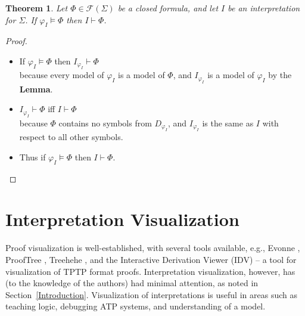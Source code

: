 \documentclass[letterpaper]{article}
\newcommand{\smalltt}[1]{\small \texttt{#1}}
\newtheorem*{theorem}{Theorem}
\begin{document}
\begin{theorem}
Let $\Phi \in \mathcal{F}(\Sigma)$ be a closed formula, and let $I$ be an interpretation for
$\Sigma$. 
If $\varphi_I \models \Phi$ then $I \vdash \Phi$.
\end{theorem}
\vspace*{-1em}
\begin{proof}
~\linebreak
\vspace*{-1.5em}
\begin{itemize}
\item If $\varphi_I \models \Phi$ then $I_{\varphi_I} \vdash \Phi$ \\
      because every model of $\varphi_I$ is a model of $\Phi$, and $I_{\varphi_I}$ is a model
      of $\varphi_I$ by the {\bf Lemma}.
\item $I_{\varphi_I} \vdash \Phi$ iff $I \vdash \Phi$ \\
      because $\Phi$ contains no symbols from $D_{\varphi_I}$, and $I_{\varphi_I}$ is the same
      as $I$ with respect to all other symbols.
\item Thus if $\varphi_I \models \Phi$ then $I \vdash \Phi$.
\end{itemize}
\end{proof}

\section{Interpretation Visualization}
\label{Visualization}

Proof visualization is well-established, with several tools available, e.g., 
Evonne \cite{AB+22},
ProofTree \cite{Tew17},
Treehehe \cite{Bat18},
and
the Interactive Derivation Viewer \cite{TPS07} (IDV) -- a tool for visualization of 
TPTP format proofs.
Interpretation visualization, however, has (to the knowledge of the authors) had minimal 
attention, as noted in Section~\ref{Introduction}. 
Visualization of interpretations is useful in areas such as teaching logic, debugging ATP 
systems, and understanding of a model.
\end{document}
